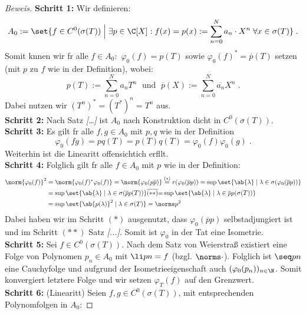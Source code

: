 \begin{proof}[Beweis]
	\textbf{Schritt 1:} Wir definieren:
	\[A_0 := \set{f \in C^0(\sigma(T)) \;\Big\vert\; \exists p \in \C[X]: f(x) = p(x):= \sum_{n=0}^N a_n \cdot X^n \;\forall x \in \sigma(T) }\;.\]
	Somit k\os nnen wir f\us r alle  \(f \in A_0:\) \(\varphi_0 (f) = p(T)\) sowie \(\varphi_0(f)^* = \overline{p}(T)\) setzen (mit $p$ zu $f$ wie in der Definition), wobei:
	\[p(T) := \sum_{n=0}^N a_n T^n\; \text{ und }\;\overline{p}(X) := \sum_{n=0}^N \overline{a_n}X^n \;.\]
	Dabei nutzen wir \((T^n)^* = (T^*)^n = T^n\) aus.\\
	\textbf{Schritt 2:} Nach Satz \textit{[\ldots]} ist $A_0$ nach Konstruktion dicht in \(C^0(\sigma(T))\).\\
	\textbf{Schritt 3:} Es gilt f\us r alle \(f, g \in A_0\) mit $p, q$ wie in der Definition
	\[ \varphi_0(fg) = pq(T) =  p(T) q(T) = \varphi_0(f)\varphi_0(g)\;.\]
	Weiterhin ist die Linearit\as t offensichtich erf\us llt. \\
	\textbf{Schritt 4:} Folglich gilt f\us r alle $f \in A_0$ mit $p$ wie in der Definition:
	\begin{align*}
	\norm{\varphi_0(f)}^2 &= \norm{\varphi_0(f)^* \varphi_0(f)} = \norm{\varphi_0(p \overline{p})} \overset{(*)}{=} r(\varphi_0(\overline p p )) = \sup\set{\ab{\lambda} \;\vert\; \lambda \in \sigma(\varphi_0(\overline p p ))} \\
	&  = \sup\set{\ab{\lambda} \;\vert\; \lambda \in \sigma(\overline p p (T))} \overline{(**)}{=} \sup\set{\ab{\lambda} \;\vert\; \lambda \in \overline p p (\sigma(T))}\\& = \sup\set{\ab{p(\lambda)}^2 \;\vert\; \lambda \in \sigma(T)}  = \norms p ^2
	\end{align*}
	Dabei haben wir im Schritt \((*)\) ausgenutzt, dass \(\varphi_0(\overline p p )\) selbstadjungiert ist und im Schritt \((**)\) Satz \textit{[...]}. Somit ist $\varphi_0$ in der Tat eine Isometrie. \\
	\textbf{Schritt 5:} Sei \(f\in C^0(\sigma(T))\). Nach dem Satz von Weierstra\ss{} existiert eine Folge von Polynomen \(p_n \in A_0\) mit \(\li pn = f\) (bzgl. \(\norms\cdot\)). Folglich ist \(\seq pn \) eine Cauchyfolge und aufgrund der Isometrieeigenschaft auch \((\varphi_0(p_n))_{n\in\N}\). Somit konvergiert letztere Folge und wir setzen \(\varphi_T(f)\) auf den Grenzwert.\\
	\textbf{Schritt 6:} (Linearit\as t) Seien \(f,g \in C^0(\sigma(T))\), mit entsprechenden Polynomfolgen in $A_0$: 

\end{proof}
